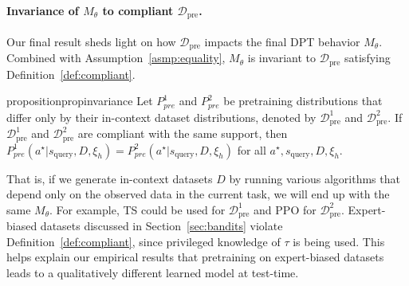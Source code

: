 \documentclass{article}
\newcommand{\Dcal}{\mathcal{D}}
\newcommand{\pretraind}{\Dcal_{\text{pre}}}
\newcommand{\squery}{s_{\text{query}}}
\begin{document}
\paragraph{Invariance of $M_{\theta}$ to compliant $\pretraind$.} Our final result sheds light on how $\pretraind$ impacts the final DPT behavior $M_{\theta}$. Combined with Assumption~\ref{asmp:equality}, $M_{\theta}$ is invariant to $\pretraind$ satisfying Definition~\ref{def:compliant}.
\begin{restatable}{proposition}{propinvariance}
\label{prop:invariance}
Let $P_{pre}^1$ and $P_{pre}^2$ be pretraining distributions that differ only by their in-context dataset distributions, denoted by $\pretraind^1$ and $\pretraind^2$. If $\pretraind^1$ and $\pretraind^2$ are compliant with the same support, then $P_{pre}^1(a^\star| \squery, D, \xi_h) = P_{pre}^2(a^\star| \squery, D, \xi_h)$ for all $a^\star, \squery, D, \xi_h$.
\end{restatable}
That is, if we generate in-context datasets $D$ by running various algorithms that depend only on the observed data in the current task, we will end up with the same $M_{\theta}$. For example, TS could be used for $\pretraind^1$ and PPO for $\pretraind^2$. Expert-biased datasets discussed in Section~\ref{sec:bandits} violate Definition~\ref{def:compliant}, since privileged knowledge of $\tau$ is being used. This helps explain our empirical results that pretraining on expert-biased datasets leads to a qualitatively different learned model at test-time.
\end{document}
